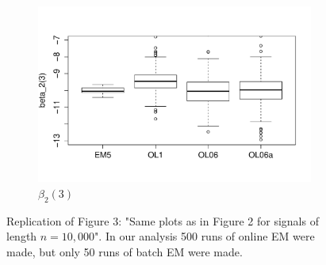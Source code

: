 \documentclass[12pt]{article}
\begin{document}
\begin{figure}[h!]
\begin{subfigure}[t]{.6\textwidth}
\end{subfigure}
\begin{subfigure}[t]{.6\textwidth}
\caption{$\beta_{2}(3)$}
\includegraphics[width = \textwidth]{fig3_beta3.PDF}
\end{subfigure}
\caption{Replication of Figure 3: "Same plots as in Figure 2 for signals of length $n = 10,000$". In our analysis 500 runs of online EM were made, but only 50 runs of batch EM were made. } 
\end{figure}
\end{document}
